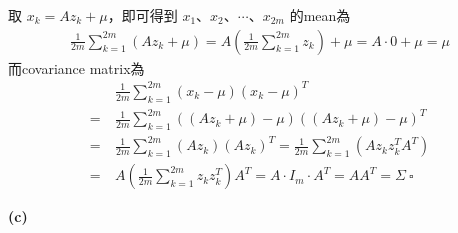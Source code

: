 \documentclass{article}
\begin{document}
取 $x_k = A z_k + \mu$，即可得到 $x_1$、$x_2$、$\cdots$、$x_{2m}$ 的mean為
\begin{align*}
    \frac{1}{2m} \sum_{k = 1}^{2m} (A z_k + \mu) = A (\frac{1}{2m} \sum_{k = 1}^{2m} z_k) + \mu = A \cdot 0 + \mu = \mu
\end{align*}
而covariance matrix為
\begin{align*}
    &\frac{1}{2m} \sum_{k = 1}^{2m} (x_k - \mu)(x_k - \mu)^T\\
    =\ &\frac{1}{2m} \sum_{k = 1}^{2m} ((A z_k + \mu) - \mu)((A z_k + \mu) - \mu)^T\\
    =\ &\frac{1}{2m} \sum_{k = 1}^{2m} (A z_k)(A z_k)^T = \frac{1}{2m} \sum_{k = 1}^{2m} (A z_k z_k^T A^T)\\
    =\ &A (\frac{1}{2m} \sum_{k = 1}^{2m} z_k z_k^T) A^T = A \cdot I_m \cdot A^T = A A^T = \Sigma\ \square
\end{align*}

\noindent
{\bf (c)}\\
\end{document}

